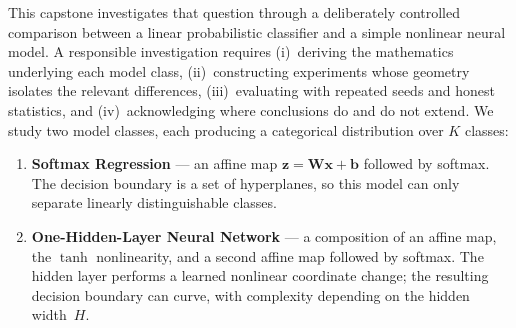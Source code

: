 \documentclass[sigconf,screen,nonacm]{acmart}
\newcommand{\1}{\mathbf{1}}
\newcommand{\vx}{\mathbf{x}}
\newcommand{\vb}{\mathbf{b}}
\newcommand{\vz}{\mathbf{z}}
\newcommand{\mW}{\mathbf{W}}
\begin{document}
This capstone investigates that question through a deliberately controlled
comparison between a linear probabilistic classifier and a simple nonlinear
neural model.  A responsible investigation requires (i)~deriving the mathematics
underlying each model class, (ii)~constructing experiments whose geometry
isolates the relevant differences, (iii)~evaluating with repeated seeds and
honest statistics, and (iv)~acknowledging where conclusions do and do not extend.
We study two model classes, each producing a categorical distribution over $K$
classes:
\begin{enumerate}[label=(\alph*),leftmargin=*]
  \item \textbf{Softmax Regression} — an affine map $\vz{=}\mW\vx{+}\vb$
        followed by softmax.  The decision boundary is a set of hyperplanes,
        so this model can only separate linearly distinguishable classes.
  \item \textbf{One-Hidden-Layer Neural Network} — a composition of an affine
        map, the $\tanh$ nonlinearity, and a second affine map followed by
        softmax.  The hidden layer performs a learned nonlinear coordinate
        change; the resulting decision boundary can curve, with complexity
        depending on the hidden width~$H$.
\end{enumerate}
\end{document}
